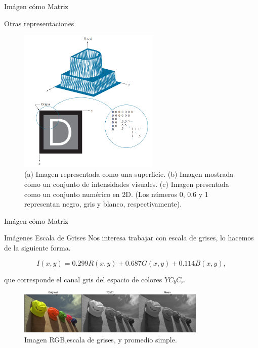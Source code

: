 \documentclass{beamer}
\begin{document}
\begin{frame}{Imágen cómo Matriz}
    \begin{block}{Otras representaciones}
        \begin{figure}[H]
            \centering
            \includegraphics[width=0.6\textwidth]{dip_4_fig2_18.png}
            \caption{
                (a) Imagen representada como una superficie.
                (b) Imagen mostrada como un conjunto de intensidades visuales.
                (c) Imagen presentada como un conjunto numérico en 2D. (Los números 0, 0.6 y 1 representan negro, gris y blanco, respectivamente).}
            \label{fig:dip_2_18}
        \end{figure}        
    \end{block}
\end{frame}

\begin{frame}{Imágen cómo Matriz}
    \begin{block}{Im\'agenes Escala de Grises}
        Nos interesa trabajar con escala de grises, lo hacemos de la siguiente forma.

        \begin{equation}
            I(x, y)=0.299 R(x, y)+0.687 G(x, y)+0.114 B(x, y), 
            \label{eq:grayscale}
        \end{equation}

        que corresponde el canal gris del espacio de colores $YC_bC_r$.

        \begin{figure}[H]
            \centering
            \includegraphics[width=0.8\textwidth]{img_ex_bw.png}
            \caption{Imagen RGB,escala de grises, y promedio simple.}
            \label{fig:rgb2gray}
        \end{figure}
    \end{block}
\end{frame}
\end{document}
